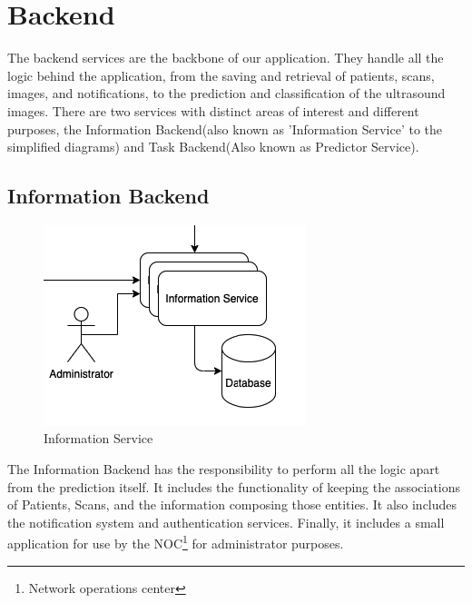 	\section{Backend}
		The backend services are the backbone of our application. They handle all the logic behind the application, from the saving 
		and retrieval of patients, scans, images, and notifications, to the prediction and classification of the ultrasound images. 
		There are two services with distinct areas of interest and different purposes, the Information Backend(also known as 
		'Information Service' to the simplified diagrams) and Task Backend(Also known as Predictor Service).
		\subsection{Information Backend}
			\begin{figure}[H]
				\iftrue
				\caption{Information Service}
				\centering
				\includegraphics[scale=0.5]{figures/infobe}
				\fi
			\end{figure}
			The Information Backend has the responsibility to perform all the logic apart from the prediction itself. It
			 includes the functionality of keeping the associations of Patients, Scans, and the information composing those 
			 entities. It also includes the notification system and authentication services. Finally, it includes a small 
			 application for use by the NOC\footnote{Network operations center}  for administrator purposes.
